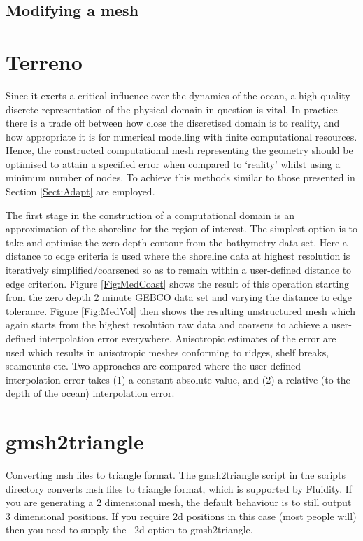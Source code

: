 \subsection{Modifying a mesh}




\section{Terreno}
Since it exerts a critical influence over the dynamics of the ocean,
a high quality discrete
representation of the physical domain in question is vital.
In practice there is a trade off between how close the discretised
domain is to reality, and how appropriate it is for numerical modelling
with finite computational resources. Hence, the constructed computational mesh
representing the geometry should be optimised
to attain a specified error when compared to `reality'
whilst using a minimum number of nodes. To achieve this methods similar to those
presented in Section \ref{Sect:Adapt} are employed.

The first stage in the construction of a computational
domain is an approximation of the shoreline for the region of
interest. The simplest option is to take and optimise the zero
depth contour from the bathymetry data set. Here a distance to edge criteria is
used where the shoreline data at highest resolution is iteratively simplified/coarsened
so as to remain within a user-defined distance to edge criterion. Figure \ref{Fig:MedCoast}
shows the result of this operation starting from the zero depth 2 minute GEBCO data set
and varying the distance to edge tolerance. Figure \ref{Fig:MedVol} then shows the
resulting unstructured mesh which again starts from the highest resolution raw data and
coarsens to achieve a user-defined interpolation error everywhere. Anisotropic
estimates of the error are used which results in anisotropic meshes conforming to ridges, shelf breaks,
seamounts etc. Two approaches are compared where the user-defined
interpolation error takes (1) a constant absolute value, and (2) a relative (to the depth of the ocean)
interpolation error.



\section{gmsh2triangle}
Converting msh files to triangle format. The gmsh2triangle script in the scripts
directory converts msh files to triangle format, which is supported by Fluidity.
If you are generating a 2 dimensional mesh, the default behaviour is to still
output 3 dimensional positions. If you require 2d positions in this case (most
people will) then you need to supply the --2d option to gmsh2triangle.

